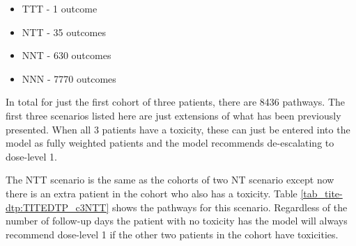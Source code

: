 \begin{itemize}
	\item TTT - 1 outcome 
	\item NTT - 35 outcomes 
	\item NNT - 630 outcomes 
	\item NNN - 7770 outcomes 
\end{itemize}

In total for just the first cohort of three patients, there are 8436 pathways. The first three scenarios listed here are just extensions of what has been previously presented. When all 3 patients have a toxicity, these can just be entered into the model as fully weighted patients and the model recommends de-escalating to dose-level 1. 

The NTT scenario is the same as the cohorts of two NT scenario except now there is an extra patient in the cohort who also has a toxicity. Table \ref{tab_tite-dtp:TITEDTP_c3NTT} shows the pathways for this scenario. Regardless of the number of follow-up days the patient with no toxicity has the model will always recommend dose-level 1 if the other two patients in the cohort have toxicities. 

